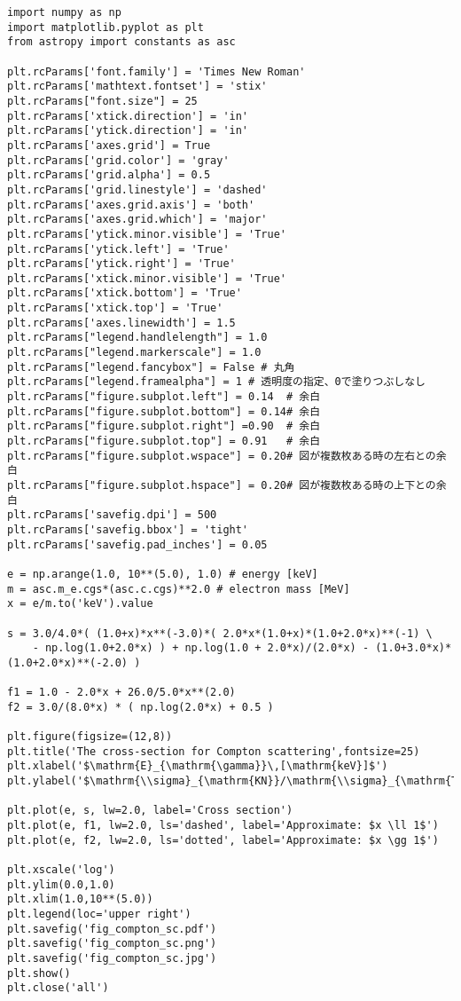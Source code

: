 \begin{lstlisting}[caption = hogehoge,label = code_1_1_1]
import numpy as np
import matplotlib.pyplot as plt
from astropy import constants as asc

plt.rcParams['font.family'] = 'Times New Roman' 
plt.rcParams['mathtext.fontset'] = 'stix' 
plt.rcParams["font.size"] = 25
plt.rcParams['xtick.direction'] = 'in' 
plt.rcParams['ytick.direction'] = 'in' 
plt.rcParams['axes.grid'] = True
plt.rcParams['grid.color'] = 'gray'
plt.rcParams['grid.alpha'] = 0.5
plt.rcParams['grid.linestyle'] = 'dashed'
plt.rcParams['axes.grid.axis'] = 'both'
plt.rcParams['axes.grid.which'] = 'major'
plt.rcParams['ytick.minor.visible'] = 'True'
plt.rcParams['ytick.left'] = 'True'
plt.rcParams['ytick.right'] = 'True'
plt.rcParams['xtick.minor.visible'] = 'True'
plt.rcParams['xtick.bottom'] = 'True'
plt.rcParams['xtick.top'] = 'True'
plt.rcParams['axes.linewidth'] = 1.5
plt.rcParams["legend.handlelength"] = 1.0
plt.rcParams["legend.markerscale"] = 1.0
plt.rcParams["legend.fancybox"] = False # 丸角
plt.rcParams["legend.framealpha"] = 1 # 透明度の指定、0で塗りつぶしなし
plt.rcParams["figure.subplot.left"] = 0.14  # 余白
plt.rcParams["figure.subplot.bottom"] = 0.14# 余白
plt.rcParams["figure.subplot.right"] =0.90  # 余白
plt.rcParams["figure.subplot.top"] = 0.91   # 余白
plt.rcParams["figure.subplot.wspace"] = 0.20# 図が複数枚ある時の左右との余白
plt.rcParams["figure.subplot.hspace"] = 0.20# 図が複数枚ある時の上下との余白
plt.rcParams['savefig.dpi'] = 500
plt.rcParams['savefig.bbox'] = 'tight'
plt.rcParams['savefig.pad_inches'] = 0.05

e = np.arange(1.0, 10**(5.0), 1.0) # energy [keV]
m = asc.m_e.cgs*(asc.c.cgs)**2.0 # electron mass [MeV]
x = e/m.to('keV').value

s = 3.0/4.0*( (1.0+x)*x**(-3.0)*( 2.0*x*(1.0+x)*(1.0+2.0*x)**(-1) \
    - np.log(1.0+2.0*x) ) + np.log(1.0 + 2.0*x)/(2.0*x) - (1.0+3.0*x)*(1.0+2.0*x)**(-2.0) )

f1 = 1.0 - 2.0*x + 26.0/5.0*x**(2.0)
f2 = 3.0/(8.0*x) * ( np.log(2.0*x) + 0.5 )

plt.figure(figsize=(12,8))
plt.title('The cross-section for Compton scattering',fontsize=25)
plt.xlabel('$\mathrm{E}_{\mathrm{\gamma}}\,[\mathrm{keV}]$')
plt.ylabel('$\mathrm{\\sigma}_{\mathrm{KN}}/\mathrm{\\sigma}_{\mathrm{T}}$')

plt.plot(e, s, lw=2.0, label='Cross section')
plt.plot(e, f1, lw=2.0, ls='dashed', label='Approximate: $x \ll 1$')
plt.plot(e, f2, lw=2.0, ls='dotted', label='Approximate: $x \gg 1$')

plt.xscale('log')
plt.ylim(0.0,1.0)
plt.xlim(1.0,10**(5.0))
plt.legend(loc='upper right')
plt.savefig('fig_compton_sc.pdf')
plt.savefig('fig_compton_sc.png')
plt.savefig('fig_compton_sc.jpg')
plt.show()
plt.close('all')
\end{lstlisting}
